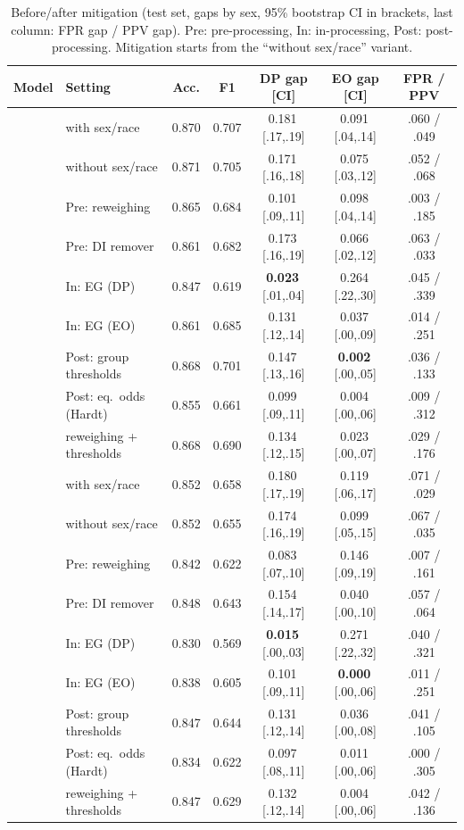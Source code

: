 \documentclass[conference]{IEEEtran}
\begin{document}
\begin{table}[t]
\caption{Before/after mitigation (test set, gaps by sex, 95\% bootstrap CI in brackets, last column: FPR gap / PPV gap). Pre: pre-processing, In: in-processing, Post: post-processing. Mitigation starts from the ``without sex/race'' variant.}
\label{tab:mit}
\centering\tiny
\setlength{\tabcolsep}{2.5pt}
\begin{tabular}{llccccc}
\toprule
Model & Setting & Acc. & F1 & DP gap [CI] & EO gap [CI] & FPR / PPV \\
\midrule
{}
 & with sex/race & 0.870 & 0.707 & 0.181\,[.17,.19] & 0.091\,[.04,.14] & .060 / .049 \\
 & without sex/race & 0.871 & 0.705 & 0.171\,[.16,.18] & 0.075\,[.03,.12] & .052 / .068 \\
 & Pre: reweighing & 0.865 & 0.684 & 0.101\,[.09,.11] & 0.098\,[.04,.14] & .003 / .185 \\
 & Pre: DI remover & 0.861 & 0.682 & 0.173\,[.16,.19] & 0.066\,[.02,.12] & .063 / .033 \\
 & In: EG (DP) & 0.847 & 0.619 & \textbf{0.023}\,[.01,.04] & 0.264\,[.22,.30] & .045 / .339 \\
 & In: EG (EO) & 0.861 & 0.685 & 0.131\,[.12,.14] & 0.037\,[.00,.09] & .014 / .251 \\
 & Post: group thresholds & 0.868 & 0.701 & 0.147\,[.13,.16] & \textbf{0.002}\,[.00,.05] & .036 / .133 \\
 & Post: eq.\ odds (Hardt) & 0.855 & 0.661 & 0.099\,[.09,.11] & 0.004\,[.00,.06] & .009 / .312 \\
 & reweighing + thresholds & 0.868 & 0.690 & 0.134\,[.12,.15] & 0.023\,[.00,.07] & .029 / .176 \\
\midrule
{}
 & with sex/race & 0.852 & 0.658 & 0.180\,[.17,.19] & 0.119\,[.06,.17] & .071 / .029 \\
 & without sex/race & 0.852 & 0.655 & 0.174\,[.16,.19] & 0.099\,[.05,.15] & .067 / .035 \\
 & Pre: reweighing & 0.842 & 0.622 & 0.083\,[.07,.10] & 0.146\,[.09,.19] & .007 / .161 \\
 & Pre: DI remover & 0.848 & 0.643 & 0.154\,[.14,.17] & 0.040\,[.00,.10] & .057 / .064 \\
 & In: EG (DP) & 0.830 & 0.569 & \textbf{0.015}\,[.00,.03] & 0.271\,[.22,.32] & .040 / .321 \\
 & In: EG (EO) & 0.838 & 0.605 & 0.101\,[.09,.11] & \textbf{0.000}\,[.00,.06] & .011 / .251 \\
 & Post: group thresholds & 0.847 & 0.644 & 0.131\,[.12,.14] & 0.036\,[.00,.08] & .041 / .105 \\
 & Post: eq.\ odds (Hardt) & 0.834 & 0.622 & 0.097\,[.08,.11] & 0.011\,[.00,.06] & .000 / .305 \\
 & reweighing + thresholds & 0.847 & 0.629 & 0.132\,[.12,.14] & 0.004\,[.00,.06] & .042 / .136 \\
\bottomrule
\end{tabular}
\end{table}
\end{document}
